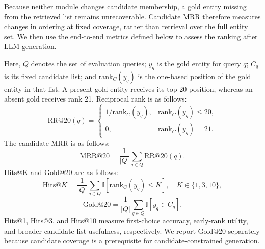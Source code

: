 \documentclass[pdflatex,sn-mathphys-num]{sn-jnl}
\begin{document}
\begin{revisionblock}Because neither module changes candidate membership, a gold entity missing from the retrieved list remains unrecoverable. Candidate MRR therefore measures changes in ordering at fixed coverage, rather than retrieval over the full entity set. We then use the end-to-end metrics defined below to assess the ranking after LLM generation.\end{revisionblock}

Here, $Q$ denotes the set of evaluation queries; $y_q$ is the gold entity for query $q$; $C_q$ is its fixed candidate list; and $\mathrm{rank}_C(y_q)$ is the one-based position of the gold entity in that list. A present gold entity receives its top-20 position, whereas an absent gold receives rank 21. Reciprocal rank is  as follows:
\begin{equation}
\mathrm{RR@20}(q)=
\begin{cases}
1/\mathrm{rank}_C(y_q), & \mathrm{rank}_C(y_q)\leq20,\\
0, & \mathrm{rank}_C(y_q)=21.
\end{cases}
\label{eq:rr}
\end{equation}
The candidate MRR is  as follows:
\begin{equation}
\mathrm{MRR@20}=\frac{1}{|Q|}\sum_{q\in Q}\mathrm{RR@20}(q).
\label{eq:mrr}
\end{equation}
Hits@K and Gold@20 are  as follows:
\begin{equation}
\mathrm{Hits@}K =
\frac{1}{|Q|}
\sum_{q\in Q}
\mathbb{I}\left[\mathrm{rank}_C(y_q)\leq K\right],
\quad K\in\{1,3,10\},
\label{eq:hits}
\end{equation}
\begin{equation}
\mathrm{Gold@20}
=
\frac{1}{|Q|}
\sum_{q\in Q}
\mathbb{I}[y_q\in C_q].
\label{eq:gold}
\end{equation}
Hits@1, Hits@3, and Hits@10 measure first-choice accuracy, early-rank utility, and broader candidate-list usefulness, respectively. We report Gold@20 separately because candidate coverage is a prerequisite for candidate-constrained generation.
\end{document}
